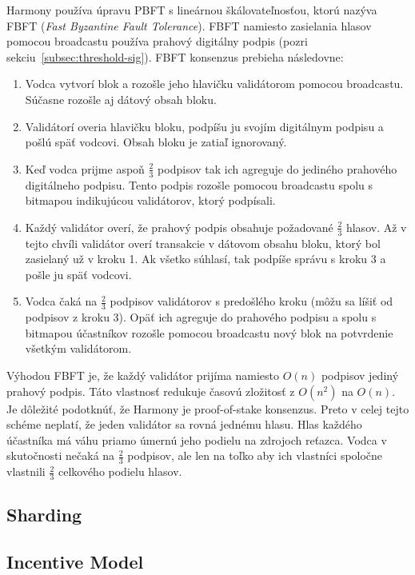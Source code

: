 Harmony používa úpravu PBFT s lineárnou škálovateľnosťou, ktorú nazýva FBFT (\textit{Fast Byzantine Fault Tolerance}). FBFT namiesto zasielania hlasov pomocou broadcastu používa prahový digitálny podpis (pozri sekciu~\ref{subsec:threshold-sig}). FBFT konsenzus prebieha následovne:
\begin{enumerate}
	\item Vodca vytvorí blok a rozošle jeho hlavičku validátorom pomocou broadcastu. Súčasne rozošle aj dátový obsah bloku.
	\item Validátorí overia hlavičku bloku, podpíšu ju svojím digitálnym podpisu a pošlú späť vodcovi. Obsah bloku je zatiaľ ignorovaný.
	\item Keď vodca prijme aspoň $\frac{2}{3}$ podpisov tak ich agreguje do jediného prahového digitálneho podpisu. Tento podpis rozošle pomocou broadcastu spolu s bitmapou indikujúcou validátorov, ktorý podpísali.
	\item Každý validátor overí, že prahový podpis obsahuje požadované $\frac{2}{3}$ hlasov. Až v tejto chvíli validátor overí transakcie v dátovom obsahu bloku, ktorý bol zasielaný už v kroku 1. Ak všetko súhlasí, tak podpíše správu s kroku 3 a pošle ju späť vodcovi.
	\item Vodca čaká na $\frac{2}{3}$ podpisov validátorov s predošlého kroku (môžu sa líšiť od podpisov z kroku 3). Opäť ich agreguje do prahového podpisu a spolu s bitmapou účastníkov rozošle pomocou broadcastu nový blok na potvrdenie všetkým validátorom. 
\end{enumerate}
Výhodou FBFT je, že každý validátor prijíma namiesto $O(n)$ podpisov jediný prahový podpis. Táto vlastnosť redukuje časovú zložitosť z $O(n^2)$ na $O(n)$. Je dôležité podotknúť, že Harmony je proof-of-stake konsenzus. Preto v celej tejto schéme neplatí, že jeden validátor sa rovná jednému hlasu. Hlas každého účastníka má váhu priamo úmernú jeho podielu na zdrojoch reťazca. Vodca v skutočnosti nečaká na $\frac{2}{3}$ podpisov, ale len na toľko aby ich vlastníci spoločne vlastnili $\frac{2}{3}$ celkového podielu hlasov.~\cite{harmonyWp}

\subsection{Sharding}

\subsection{Incentive Model}

